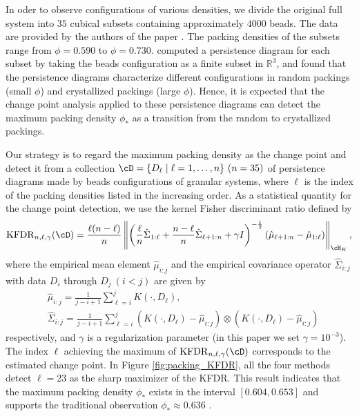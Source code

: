 \documentclass{article}
\newcommand{\KFDR}{{\rm KFDR}}
\providecommand{\norm}[1]{\left\lVert#1\right\rVert}
\providecommand{\pare}[1]{\left( #1 \right)}
\begin{document}
In oder to observe configurations of various densities, we divide the original full system into $35$ cubical subsets containing approximately $4000$ beads.
The data are provided by the authors of the paper \cite{FSCS11}.
The packing densities of the subsets range from $\phi=0.590$ to $\phi=0.730$.
\cite{STRFH17} computed a persistence diagram for each subset by taking the beads configuration as a finite subset in $\mathbb{R}^3$, and found that the persistence diagrams characterize different configurations in random packings (small $\phi$) and crystallized packings (large $\phi$).
Hence, it is expected that the change point analysis applied to these persistence diagrams can detect the maximum packing density $\phi_*$ as a transition from the random to crystallized packings. 

Our strategy is to regard the maximum packing density as the change point and detect it from a collection $\cD=\{D_{\ell} \mid \ell=1,\ldots,n\} \ (n=35)$ of persistence diagrams made by beads configurations of granular systems, where $\ell$ is the index of the packing densities listed in the increasing order.
As a statistical quantity for the change point detection, we use the kernel Fisher discriminant ratio \cite{HMB09} defined by
\begin{equation}
\label{eq:kfdr}
\KFDR_{n,\ell,\gamma}(\cD)=\frac{\ell(n- \ell )}{n} \norm{ \pare{\frac{ \ell }{n} \hat{\Sigma}_{1: \ell }+\frac{n- \ell }{n} \hat{\Sigma}_{ \ell+1:n} +\gamma I}^{-\frac{1}{2}} \pare{\hat{\mu}_{ \ell+1:n}-\hat{\mu}_{1: \ell }} }_{\cH_{K}},
\end{equation}
where the empirical mean element $\hat{\mu}_{i:j}$ and the empirical covariance operator $\hat{\Sigma}_{i:j}$ with data $D_{i}$ through $D_{j} \ (i<j)$ are given by
\begin{align*}
&\hat{\mu}_{i:j}=\frac{1}{j-i+1} \sum^{j}_{\ell=i} K(\cdot,D_{\ell}), \\
&\hat{\Sigma}_{i:j}=\frac{1}{j-i+1}\sum^{j}_{\ell=i} \pare{K(\cdot,D_{\ell})-\hat{\mu}_{i:j} } \otimes  \pare{K(\cdot,D_{\ell})-\hat{\mu}_{i:j} }
\end{align*}
respectively, and $\gamma$ is a regularization parameter (in this paper we set $\gamma=10^{-3}$).
The index $\ell$ achieving the maximum of $\KFDR_{n,\ell,\gamma}(\cD)$ corresponds to the estimated change point. 
In Figure \ref{fig:packing_KFDR}, all the four methods detect $\ell=23$ as the sharp maximizer of the KFDR. This result indicates that the maximum packing density $\phi_*$ exists in the interval $[0.604,0.653]$ and supports the traditional observation $\phi_* \approx 0.636$ \cite{An72}.
\end{document}
